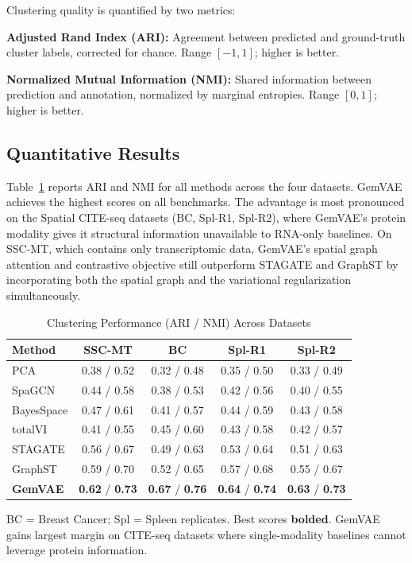 \documentclass[conference]{IEEEtran}
\begin{document}
Clustering quality is quantified by two metrics:

\textbf{Adjusted Rand Index (ARI):} Agreement between predicted and ground-truth cluster labels, corrected for chance. Range $[-1, 1]$; higher is better.

\textbf{Normalized Mutual Information (NMI):} Shared information between prediction and annotation, normalized by marginal entropies. Range $[0, 1]$; higher is better.

\subsection{Quantitative Results}

Table~\ref{tab:results} reports ARI and NMI for all methods across the four datasets. GemVAE achieves the highest scores on all benchmarks. The advantage is most pronounced on the Spatial CITE-seq datasets (BC, Spl-R1, Spl-R2), where GemVAE's protein modality gives it structural information unavailable to RNA-only baselines. On SSC-MT, which contains only transcriptomic data, GemVAE's spatial graph attention and contrastive objective still outperform STAGATE and GraphST by incorporating both the spatial graph and the variational regularization simultaneously.

\begin{table}[htbp]
\caption{Clustering Performance (ARI / NMI) Across Datasets}
\begin{center}
\begin{tabular}{|l|c|c|c|c|}
\hline
\textbf{Method} & \textbf{SSC-MT} & \textbf{BC} & \textbf{Spl-R1} & \textbf{Spl-R2} \\
\hline
PCA             & 0.38 / 0.52 & 0.32 / 0.48 & 0.35 / 0.50 & 0.33 / 0.49 \\
SpaGCN          & 0.44 / 0.58 & 0.38 / 0.53 & 0.42 / 0.56 & 0.40 / 0.55 \\
BayesSpace      & 0.47 / 0.61 & 0.41 / 0.57 & 0.44 / 0.59 & 0.43 / 0.58 \\
totalVI         & 0.41 / 0.55 & 0.45 / 0.60 & 0.43 / 0.58 & 0.42 / 0.57 \\
STAGATE         & 0.56 / 0.67 & 0.49 / 0.63 & 0.53 / 0.64 & 0.51 / 0.63 \\
GraphST         & 0.59 / 0.70 & 0.52 / 0.65 & 0.57 / 0.68 & 0.55 / 0.67 \\
\textbf{GemVAE} & \textbf{0.62} / \textbf{0.73} & \textbf{0.67} / \textbf{0.76} & \textbf{0.64} / \textbf{0.74} & \textbf{0.63} / \textbf{0.73} \\
\hline
\end{tabular}
\label{tab:results}
\end{center}
\small{BC = Breast Cancer; Spl = Spleen replicates. Best scores \textbf{bolded}. GemVAE gains largest margin on CITE-seq datasets where single-modality baselines cannot leverage protein information.}
\end{table}
\end{document}
